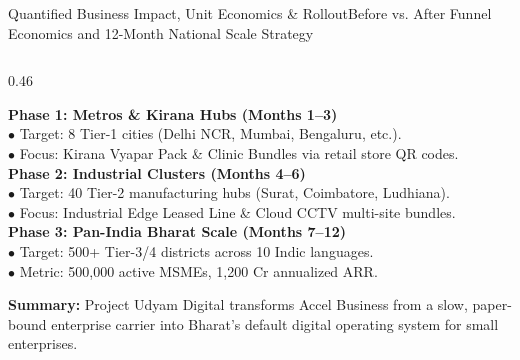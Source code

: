 \documentclass[aspectratio=169,10pt]{beamer}
\newcommand{\inr}{\text{Rs.\ }}
\begin{document}
\begin{frame}{Quantified Business Impact, Unit Economics \& Rollout}{Before vs. After Funnel Economics and 12-Month National Scale Strategy}
\begin{columns}[T]
    \begin{column}{0.46\textwidth}
      \begin{tcolorbox}[academicbox, title={\fontsize{6.5pt}{7.8pt}\selectfont\textbf{12-Month Phased National Rollout}}, coltitle=charcoal]
        {\fontsize{5.2pt}{6.3pt}\selectfont
        \textbf{Phase 1: Metros \& Kirana Hubs (Months 1--3)} \\
        $\bullet$ Target: 8 Tier-1 cities (Delhi NCR, Mumbai, Bengaluru, etc.). \\
        $\bullet$ Focus: Kirana Vyapar Pack \& Clinic Bundles via retail store QR codes. \\[0.06cm]
        \textbf{Phase 2: Industrial Clusters (Months 4--6)} \\
        $\bullet$ Target: 40 Tier-2 manufacturing hubs (Surat, Coimbatore, Ludhiana). \\
        $\bullet$ Focus: Industrial Edge Leased Line \& Cloud CCTV multi-site bundles. \\[0.06cm]
        \textbf{Phase 3: Pan-India Bharat Scale (Months 7--12)} \\
        $\bullet$ Target: 500+ Tier-3/4 districts across 10 Indic languages. \\
        $\bullet$ Metric: 500,000 active MSMEs, \inr 1,200 Cr annualized ARR.
        }
      \end{tcolorbox}

      \vspace{0.06cm}
      \begin{tcolorbox}[academicbox]
        \centering
        {\fontsize{5.5pt}{6.8pt}\selectfont
        \textbf{Summary:} Project Udyam Digital transforms Accel Business from a slow, paper-bound enterprise carrier into Bharat's default digital operating system for small enterprises.
        }
      \end{tcolorbox}
    \end{column}
  \end{columns}
\end{frame}
\end{document}
